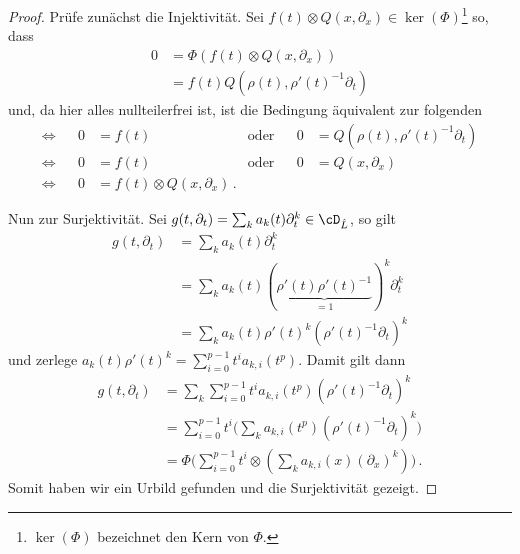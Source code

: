 \begin{proof}
Prüfe zunächst die Injektivität. Sei $f(t)\otimes Q(x,\partial_x)\in
\ker(\Phi)$\footnote{
$\ker(\Phi)$ bezeichnet den Kern von $\Phi$.
} so, dass
\begin{align*}
0 &= \Phi(f(t)\otimes Q(x,\partial_x))
\\&= f(t)Q(\rho(t),\rho'(t)^{-1}\partial_t)
\end{align*}
und, da hier alles nullteilerfrei ist, ist die Bedingung äquivalent zur
folgenden
\begin{align*}
\Leftrightarrow && 0&=f(t) &\text{oder}&& 0&=Q(\rho(t),\rho'(t)^{-1}\partial_t)
\\\Leftrightarrow && 0&=f(t) &\text{oder}&& 0&=Q(x,\partial_x)
\\\Leftrightarrow&& 0&=f(t)\otimes Q(x,\partial_x) \,.
\end{align*}
\begin{comment} TODO: korrekt? \end{comment}
Nun zur Surjektivität.
Sei $g(t,\partial_t)=\sum_ka_k(t)\partial_t^k\in\cD_{\hat L}$, so gilt
\begin{align*}
g(t,\partial_t)&=\sum_ka_k(t)\partial_t^k
\\&=\sum_ka_k(t)(\underset{=1}{\underbrace{\rho'(t)\rho'(t)^{-1}}})^k
  \partial_t^k
\\&=\sum_ka_k(t)\rho'(t)^k(\rho'(t)^{-1} \partial_t)^k
\end{align*}
und zerlege $a_k(t)\rho'(t)^k=\sum_{i=0}^{p-1}t^ia_{k,i}(t^p)$. Damit gilt dann
\begin{align*}
g(t,\partial_t)&= \sum_k\sum_{i=0}^{p-1}t^ia_{k,i}(t^p)
  (\rho'(t)^{-1} \partial_t)^k
\\&= \sum_{i=0}^{p-1}t^i\Big(\sum_ka_{k,i}(t^p)
  (\rho'(t)^{-1} \partial_t)^k\Big)
\\&= \Phi\Big(\sum_{i=0}^{p-1}t^i\otimes(\sum_ka_{k,i}(x)
  (\partial_x)^k)\Big) \,.
\end{align*}
Somit haben wir ein Urbild gefunden und die Surjektivität gezeigt.
\end{proof}

